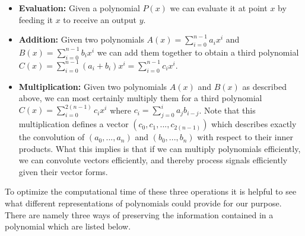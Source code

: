 \documentclass[12pt]{article}
\begin{document}
\begin{itemize}
\item{\textbf{Evaluation:}} Given a polynomial $P(x)$ we can evaluate it at point $x$ by feeding it $x$ to receive an output $y$.

\item{\textbf{Addition:}} Given two polynomials $A(x) = \sum_{i=0}^{n-1} a_ix^i$ and $B(x) = \sum_{i=0}^{n-1} b_ix^i$ we can add them together to obtain a third polynomial $C(x) = \sum_{i=0}^{n-1} (a_i+b_i)x^i = \sum_{i=0}^{n-1} c_ix^i$.

\item {\textbf{Multiplication:}} Given two polynomials $A(x)$ and $B(x)$ as described above, we can most certainly multiply them for a third polynomial $C(x) = \sum_{i=0}^{2(n-1)} c_ix^i$ where $c_i = \sum_{j=0}^{i} a_jb_{i-j}$. Note that this multiplication defines a vector $(c_0, c_1, ..., c_{2(n-1)})$ which describes exactly the convolution of $(a_0,..., a_n)$ and $(b_0, ..., b_n)$ with respect to their inner products. What this implies is that if we can multiply polynomials efficiently, we can convolute vectors efficiently, and thereby process signals efficiently given their vector forms.
\end{itemize}

To optimize the computational time of these three operations it is helpful to see what different representations of polynomials could provide for our purpose. There are namely three ways of preserving the information contained in a polynomial which are listed below.
\end{document}
